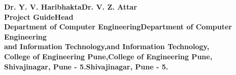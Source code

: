 \begin{center}		%

\normalsize{\bf{Dr. Y. V. HaribhaktaDr. V. Z. Attar\\
Project GuideHead}\\
Department of Computer EngineeringDepartment of Computer Engineering\\
and Information Technology,and Information Technology,\\
College of Engineering Pune,College of Engineering Pune,\\
Shivajinagar, Pune - 5.Shivajinagar, Pune - 5.}
\end{center}

